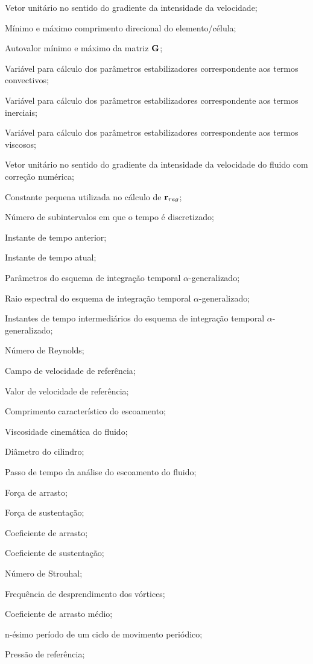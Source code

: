 \begin{simbolos}
\item[$\rRGN$] Vetor unitário no sentido do gradiente da intensidade da velocidade;
\item[$h_{min}$,$h_{max}$] Mínimo e máximo comprimento direcional do elemento/célula;
\item[$\lambda_{min}$,$\lambda_{max}$] Autovalor mínimo e máximo da matriz $\mathbf{G}$;
\item[$\SUGNi$] Variável para cálculo dos parâmetros estabilizadores correspondente aos termos convectivos;
\item[$\SUGNii$] Variável para cálculo dos parâmetros estabilizadores correspondente aos termos inerciais;
\item[$\SUGNiii$] Variável para cálculo dos parâmetros estabilizadores correspondente aos termos viscosos;
\item[$\rRGN_{reg}$] Vetor unitário no sentido do gradiente da intensidade da velocidade do fluido com correção numérica;
\item[$\varepsilon$] Constante pequena utilizada no cálculo de $\rRGN_{reg}$;
\item[$npt$] Número de subintervalos em que o tempo é discretizado;
\item[$t_{n}$] Instante de tempo anterior; 
\item[$t_{n+1}$] Instante de tempo atual;
\item[$\alpham, \alphaf, \gamma$] Parâmetros do esquema de integração temporal $\alpha$-generalizado;
\item[$\specRadius$] Raio espectral do esquema de integração temporal $\alpha$-generalizado; 
\item[$t_{n+\alpha_f}$,$t_{n+\alpha_m}$] Instantes de tempo intermediários do esquema de integração temporal $\alpha$-generalizado;
\item[$\Reynolds$] Número de Reynolds;
\item[$\velocinfty$] Campo de velocidade de referência;
\item[$u_{\infty}$] Valor de velocidade de referência;
\item[$L$] Comprimento característico do escoamento;
\item[$\kviscosity$] Viscosidade cinemática do fluido;
\item[$D$] Diâmetro do cilindro;
\item[$\Delta \tempo$] Passo de tempo da análise do escoamento do fluido;
\item[$F_D$] Força de arrasto;
\item[$F_L$] Força de sustentação;
\item[$C_D$] Coeficiente de arrasto;
\item[$C_L$] Coeficiente de sustentação;
\item[$\Strouhal$] Número de Strouhal;
\item[$f_v$] Frequência de desprendimento dos vórtices;
\item[$C_{Dmed}$] Coeficiente de arrasto médio;
\item[$nT$] n-ésimo período de um ciclo de movimento periódico;
\item[$p_{\infty}$] Pressão de referência;


\end{simbolos}
